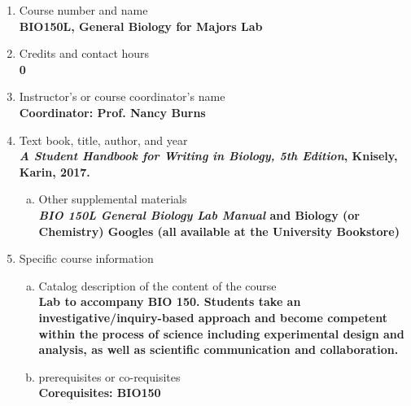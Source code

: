 \label{BIO150L}  %
\begin{enumerate}[1.]
\item Course number and name\\
  {\bfseries
    BIO150L, General Biology for Majors Lab
  }
  
\item Credits and contact hours\\
  {\bfseries
    0    
  }

\item Instructor's or course coordinator's name\\
  {\bfseries
    Coordinator: Prof. Nancy Burns
  }

\item Text book, title, author, and year\\
  {\bfseries
    {\em A Student Handbook for Writing in Biology, 5th Edition}, Knisely, Karin, 2017.
  }
\begin{enumerate}[a.]
\item Other supplemental materials\\
  {\bfseries
    {\em BIO 150L General Biology Lab Manual} and Biology (or Chemistry) Googles (all available at the University Bookstore)
  }
\end{enumerate}

\item Specific course information
\begin{enumerate}[a.]  
\item Catalog description of the content of the course\\
  {\bfseries
Lab to accompany BIO 150. Students take an investigative/inquiry-based approach and become competent within the process of science including experimental design and analysis, as well as scientific communication and collaboration.    
  }

\item prerequisites or co-requisites\\
  {\bfseries
    Corequisites: BIO150
  }


\end{enumerate}
\end{enumerate}
